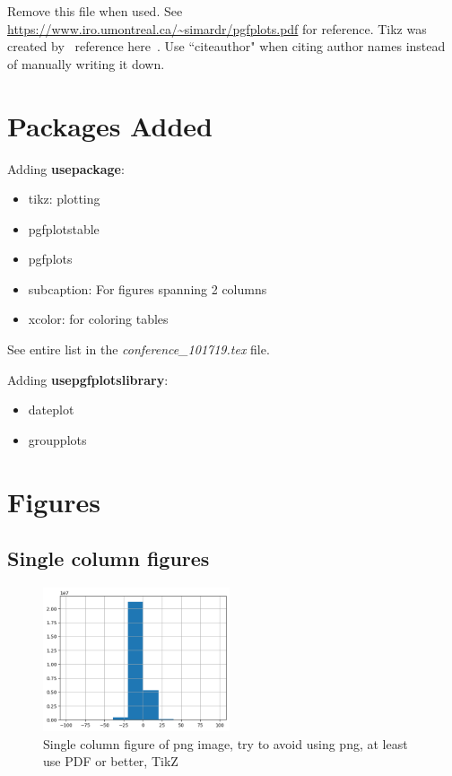Remove this file when used. See \url{https://www.iro.umontreal.ca/~simardr/pgfplots.pdf} for reference.
Tikz was created by~\citeauthor{Tan12} reference here~\cite{Tan12}. Use ``citeauthor" when citing author names instead of manually writing it down. 


\section{Packages Added}

Adding \textbf{usepackage}:
\begin{itemize}
    \item tikz: plotting
    \item pgfplotstable
    \item pgfplots
    \item subcaption: For figures spanning 2 columns
    \item xcolor: for coloring tables
\end{itemize}

See entire list in the \textit{conference\_101719.tex} file.

Adding \textbf{usepgfplotslibrary}:
\begin{itemize}
    \item dateplot
    \item groupplots
\end{itemize}

\section{Figures}

\subsection{Single column figures}

\begin{figure}[!htbp]
    \centering
    \includegraphics[width=0.49\textwidth]{images/output.png}
    \caption{Single column figure of png image, try to avoid using png, at least use PDF or better, TikZ}
    \label{fig:my_label}
\end{figure}


